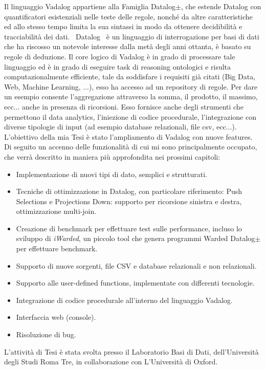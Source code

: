 Il linguaggio Vadalog appartiene alla Famiglia Datalog$\pm $, che estende Datalog con quantificatori esistenziali nelle teste delle regole, nonché da altre caratteristiche ed allo stesso tempo limita la sua sintassi in modo da ottenere decidibilità e tracciabilità dei dati.~\cite{cali2013taming,cali2012towards,cali2010datalog+}\newline
Datalog~\cite{atzeni2006basi} è un linguaggio di interrogazione per basi di dati che ha riscosso un notevole interesse dalla metà degli anni ottanta, è basato su regole di deduzione. \newline
Il core logico di Vadalog è in grado di processare tale linguaggio ed è in grado di eseguire task di reasoning ontologici e risulta computazionalmente efficiente, tale da soddisfare i requisiti già citati (Big Data, Web, Machine Learning, ...), esso ha accesso ad un repository di regole. Per dare un esempio consente l'aggregazione attraverso la somma, il prodotto, il massimo, ecc... anche in presenza di ricorsioni. \newline
Esso fornisce anche degli strumenti che permettono il data analytics, l'iniezione di codice procedurale, l'integrazione con diverse tipologie di input (ad esempio database relazionali, file csv, ecc...).\newline \newline
L'obiettivo della mia Tesi è stato l'ampliamento di Vadalog con nuove features. \newline
Di seguito un accenno delle funzionalità di cui mi sono principalmente occupato, che verrà descritto in maniera più approfondita nei prossimi capitoli:
\begin{itemize}
	\item Implementazione di nuovi tipi di dato, semplici e strutturati.
	\item Tecniche di ottimizzazione in Datalog, con particolare riferimento: Push Selections e Projections Down: supporto per ricorsione sinistra e destra, ottimizzazione multi-join.
	\item Creazione di benchmark per effettuare test sulle performance, incluso lo sviluppo di \textit{iWarded}, un piccolo tool che genera programmi Warded Datalog$\pm $ per effettuare benchmark.
	\item Supporto di nuove sorgenti, file CSV e database relazionali e non relazionali.
	\item Supporto alle user-defined functions, implementate con differenti tecnologie.
	\item Integrazione di codice procedurale all'interno del linguaggio Vadalog.
	\item Interfaccia web (console).
	\item Risoluzione di bug.
\end{itemize}
L'attività di Tesi è stata svolta presso il Laboratorio Basi di Dati, dell'Università degli Studi Roma Tre, in collaborazione con L'Università di Oxford.
